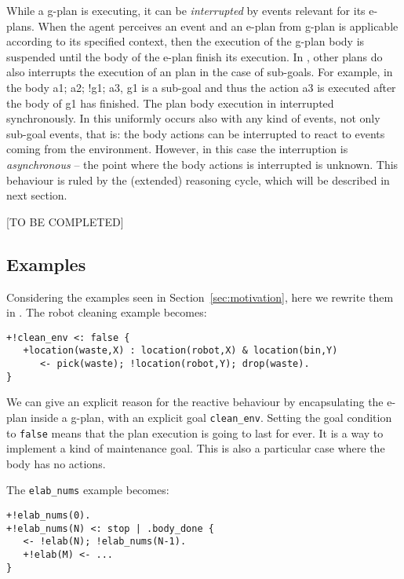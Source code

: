 While a g-plan is executing, it can be \emph{interrupted} by events relevant for its e-plans. When the agent perceives an event and an e-plan from g-plan is applicable according to its specified context, then the execution of the g-plan body is suspended until the body of the e-plan finish its execution.
%
In {\asl}, other plans do also interrupts the execution of an plan in the case of sub-goals. For example, in the body \textsf{a1; a2; !g1; a3}, \textsf{g1} is a sub-goal and thus the action \textsf{a3} is executed after the body of \textsf{g1} has finished. The plan body execution in interrupted synchronously.
%
In {\aser} this uniformly occurs also with any kind of events, not only sub-goal events, that is: the body actions can be interrupted to react to events coming from the environment. However, in this case the interruption is \emph{asynchronous} -- the point where the body actions is interrupted is unknown.
%
This behaviour is ruled by the (extended) reasoning cycle, which will be described in next section.


[TO BE COMPLETED]

\subsection{Examples}

Considering the examples seen in Section~\ref{sec:motivation}, here we rewrite them in {\aser}. 
%
The robot cleaning example becomes:

\begin{small}
\begin{verbatim}
+!clean_env <: false {
   +location(waste,X) : location(robot,X) & location(bin,Y)
      <- pick(waste); !location(robot,Y); drop(waste).
}
\end{verbatim}
\end{small}

\noindent We can give an explicit reason for the reactive behaviour by encapsulating the e-plan inside a g-plan, with an explicit goal \texttt{clean\_env}.
%
Setting the goal condition to \texttt{false} means that  the plan execution is going to last for ever. It is a way to implement a kind of maintenance goal.
%
This is also a particular case where the body has no actions.
%

The \texttt{elab\_nums} example becomes:

{\small
\begin{verbatim}
+!elab_nums(0).
+!elab_nums(N) <: stop | .body_done {
   <- !elab(N); !elab_nums(N-1).	
   +!elab(M) <- ...
}
\end{verbatim}}

